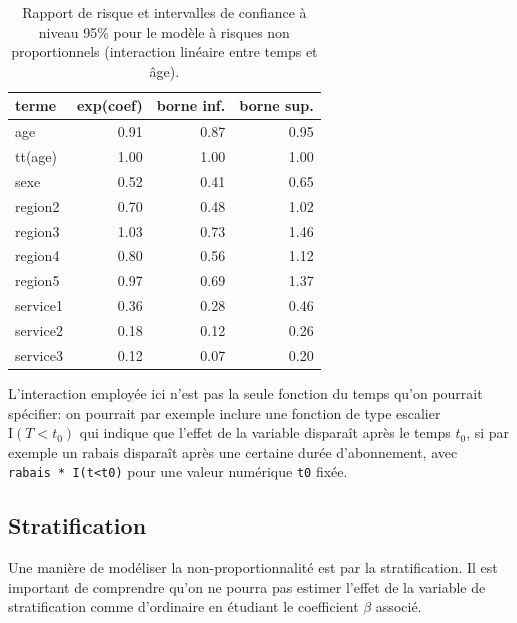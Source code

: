 \documentclass[
  11pt,
  letterpaper,
]{book}
\theoremstyle{definition}
\theoremstyle{remark}
\begin{document}
\hypertarget{tbl-cox-np}{}
\begin{table}
\caption{\label{tbl-cox-np}Rapport de risque et intervalles de confiance à niveau 95\% pour le
modèle à risques non proportionnels (interaction linéaire entre temps et
âge). }\tabularnewline

\centering
\begin{tabular}{lrrr}
\toprule
terme & exp(coef) & borne inf. & borne sup.\\
\midrule
age & 0.91 & 0.87 & 0.95\\
tt(age) & 1.00 & 1.00 & 1.00\\
sexe & 0.52 & 0.41 & 0.65\\
region2 & 0.70 & 0.48 & 1.02\\
region3 & 1.03 & 0.73 & 1.46\\
\addlinespace
region4 & 0.80 & 0.56 & 1.12\\
region5 & 0.97 & 0.69 & 1.37\\
service1 & 0.36 & 0.28 & 0.46\\
service2 & 0.18 & 0.12 & 0.26\\
service3 & 0.12 & 0.07 & 0.20\\
\bottomrule
\end{tabular}
\end{table}

L'interaction employée ici n'est pas la seule fonction du temps qu'on
pourrait spécifier: on pourrait par exemple inclure une fonction de type
escalier \(\mathrm{I}(T< t_0)\) qui indique que l'effet de la variable
disparaît après le temps \(t_0\), si par exemple un rabais disparaît
après une certaine durée d'abonnement, avec
\texttt{rabais\ *\ I(t\textless{}t0)} pour une valeur numérique
\texttt{t0} fixée.

\hypertarget{stratification}{%
\subsection{Stratification}\label{stratification}}

Une manière de modéliser la non-proportionnalité est par la
stratification. Il est important de comprendre qu'on ne pourra pas
estimer l'effet de la variable de stratification comme d'ordinaire en
étudiant le coefficient \(\beta\) associé.
\end{document}
